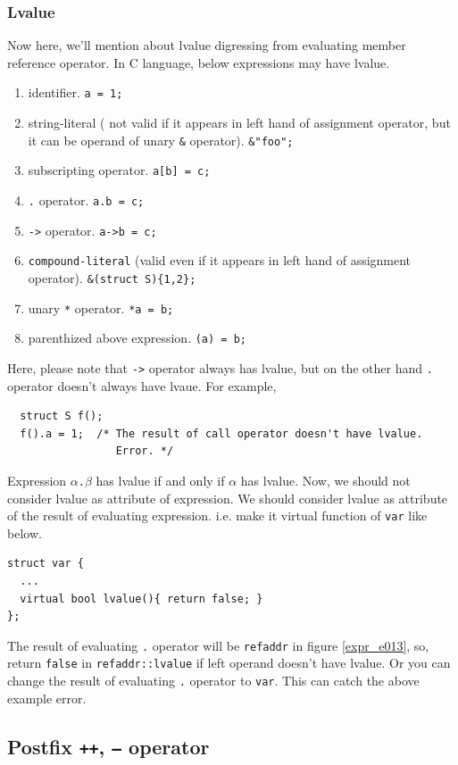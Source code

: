 \subsubsection{Lvalue}
\label{expr_e023}
Now here, we'll mention about lvalue digressing from
evaluating member reference operator.
In C language, below expressions may have lvalue.
\begin{enumerate}
\item identifier. {\tt{a = 1;}}
\item string-literal ( not valid if it appears in left hand of
assignment operator, but it can be operand of unary {\tt{\&}} operator).
{\tt{\&"foo";}}
\item subscripting operator. {\tt{a[b] = c;}}
\item {\tt{.}} operator. {\tt{a.b = c;}}
\item {\tt{->}} operator. {\tt{a->b = c;}}
\item {\tt{compound-literal}} (valid even if it appears in left hand of
assignment operator). {\tt{\&(struct S)\{1,2\};}}
\item unary {\tt{*}} operator. {\tt{*a = b;}}
\item parenthized above expression. {\tt{(a) = b;}}
\end{enumerate}
Here, please note that {\tt{->}} operator always has lvalue,
but on the other hand {\tt{.}} operator doesn't always have lvaue.
For example,
\begin{verbatim}
  struct S f();
  f().a = 1;  /* The result of call operator doesn't have lvalue.
                 Error. */
\end{verbatim}
Expression {\tt{$\alpha$.$\beta$}} has lvalue if and only if
$\alpha$ has lvalue.
Now, we should not consider lvalue as attribute of expression.
We should consider lvalue as attribute of the result of evaluating
expression. i.e. make it virtual function of {\tt{var}} like below.
\begin{verbatim}
struct var {
  ...
  virtual bool lvalue(){ return false; }
};
\end{verbatim}

The result of evaluating {\tt{.}} operator will be
{\tt{refaddr}} in figure \ref{expr_e013}, so, return {\tt{false}}
in {\tt{refaddr::lvalue}} if left operand doesn't have lvalue.
Or you can change the result of evaluating {\tt{.}} operator
to {\tt{var}}. This can catch the above example error.

\subsection{Postfix {\tt{++}}, {\tt{--}} operator}
\label{expr_e007}

